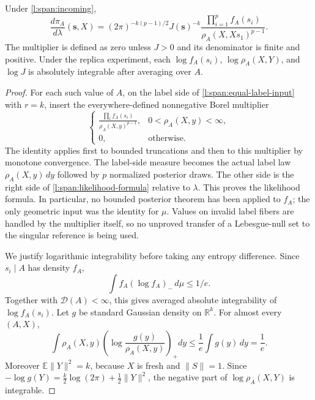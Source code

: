\begin{lemma}
\label{l:span:likelihood}
Under \eqref{l:span:incoming},
\begin{equation}
 \frac{d\pi_A}{d\lambda}(\mathbf s,X)
  =(2\pi)^{-k(p-1)/2}J(\mathbf s)^{-k}
       \frac{\prod_{i=1}^p f_A(s_i)}
            {\rho_A(X,Xs_1)^{p-1}}.
 \label{l:span:likelihood-formula}
\end{equation}
The multiplier is defined as zero unless \(J>0\) and its
denominator is finite and positive.  Under the replica experiment,
each \(\log f_A(s_i)\), \(\log\rho_A(X,Y)\), and \(\log J\) is
absolutely integrable after averaging over \(A\).
\end{lemma}
\begin{proof}
For each such value of \(A\), on the label side of
\eqref{l:span:equal-label-input} with \(r=k\), insert the
everywhere-defined nonnegative Borel multiplier
\[
 \begin{cases}
 \displaystyle\frac{\prod_i f_A(s_i)}{\rho_A(X,y)^{p-1}},
       &0<\rho_A(X,y)<\infty,\\
 0,&\text{otherwise}.
 \end{cases}
\]
The identity applies first to bounded truncations and then to this
multiplier by monotone convergence.  The label-side measure becomes
the actual label law \(\rho_A(X,y)\,dy\) followed by \(p\) normalized
posterior draws.  The other side is the right side of
\eqref{l:span:likelihood-formula} relative to \(\lambda\).
This proves the likelihood formula.  In particular, no bounded
posterior theorem has been applied to \(f_A\); the only geometric
input was the identity for \(\mu\).  Values on invalid label fibers
are handled by the multiplier itself, so no unproved transfer of a
Lebesgue-null set to the singular reference is being used.

We justify logarithmic integrability before taking any entropy
difference.  Since \(s_i\mid A\) has density \(f_A\),
\[
 \int f_A(\log f_A)_-\,d\mu\le 1/e.
\]
Together with \(\mathcal D(A)<\infty\), this gives averaged absolute
integrability of \(\log f_A(s_i)\).  Let \(g\) be standard Gaussian
density on \(\mathbb R^k\).  For almost every \((A,X)\),
\[
 \int\rho_A(X,y)
       \left(\log\frac{g(y)}{\rho_A(X,y)}\right)_+dy
 \le \frac1e\int g(y)\,dy=\frac1e.
\]
Moreover \(\mathbb E\|Y\|^2=k\), because \(X\) is fresh and
\(\|S\|=1\).  Since
\(-\log g(Y)=\tfrac{k}{2}\log(2\pi)+\tfrac12\|Y\|^2\),
the negative part of \(\log\rho_A(X,Y)\) is integrable.


\end{proof}
